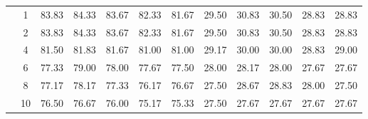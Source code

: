 \begin{table}[H]
\begin{tabular}{|c|c|c c c c c|c c c c c|}
\multicolumn{1}{|c|}{ \multirow{6}{*}{\rotatebox[origin=c]{90}{\textbf{K-vizinhos}}} }
&1	&83.83	&84.33	&83.67	&82.33	&81.67	&29.50	&30.83&	30.50&	28.83	&28.83	\\\cline{2-12}
&2	&83.83	&84.33	&83.67	&82.33	&81.67	&29.50	&30.83&	30.50&	28.83	&28.83	\\\cline{2-12}
&4	&81.50	&81.83	&81.67	&81.00	&81.00	&29.17	&30.00&	30.00&	28.83	&29.00	\\\cline{2-12}
&6	&77.33	&79.00	&78.00	&77.67	&77.50	&28.00	&28.17&	28.00&	27.67	&27.67	\\\cline{2-12}
&8	&77.17	&78.17	&77.33	&76.17	&76.67	&27.50	&28.67&	28.83&	28.00	&27.50	\\\cline{2-12}
&10	&76.50	&76.67	&76.00	&75.17	&75.33	&27.50	&27.67&	27.67&	27.67	&27.67	



\\\midrule





	\end{tabular}
\end{table}



